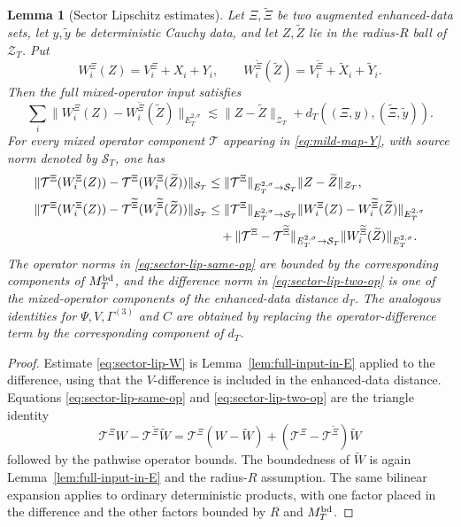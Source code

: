 \documentclass[10pt]{amsart}
\numberwithin{equation}{section}
\theoremstyle{plain}
\newtheorem{lemma}[theorem]{Lemma}
\theoremstyle{definition}
\theoremstyle{remark}
\newcommand{\calZ}{\mathcal{Z}}
\begin{document}
\begin{lemma}[Sector Lipschitz estimates]\label{lem:sector-lipschitz-estimates}
Let $\Xi,\widetilde\Xi$ be two augmented enhanced-data sets, let $y,\widetilde y$ be deterministic Cauchy data, and let $Z,\widetilde Z$ lie in the radius-$R$ ball of $\calZ_T$.  Put
\[
        W_i^\Xi(Z)=V_i^\Xi+X_i+Y_i,
        \qquad
        W_i^{\widetilde\Xi}(\widetilde Z)=V_i^{\widetilde\Xi}+\widetilde X_i+\widetilde Y_i.
\]
Then the full mixed-operator input satisfies
\begin{equation}\label{eq:sector-lip-W}
        \sum_i\|W_i^\Xi(Z)-W_i^{\widetilde\Xi}(\widetilde Z)\|_{E_T^{2,\sigma}}
        \lesssim
        \|Z-\widetilde Z\|_{\calZ_T}
        +d_T((\Xi,y),(\widetilde\Xi,\widetilde y)).
\end{equation}
For every mixed operator component $\mathcal T$ appearing in \eqref{eq:mild-map-Y}, with source norm denoted by $\mathcal S_T$, one has
\begin{align}
\|\mathcal T^\Xi(W_i^\Xi(Z))-\mathcal T^\Xi(W_i^\Xi(\widetilde Z))\|_{\mathcal S_T}
&\le \|\mathcal T^\Xi\|_{E_T^{2,\sigma}\to\mathcal S_T}
       \|Z-\widetilde Z\|_{\calZ_T},
\label{eq:sector-lip-same-op}\\
\|\mathcal T^\Xi(W_i^\Xi(Z))-\mathcal T^{\widetilde\Xi}(W_i^{\widetilde\Xi}(\widetilde Z))\|_{\mathcal S_T}
&\le \|\mathcal T^\Xi\|_{E_T^{2,\sigma}\to\mathcal S_T}
       \|W_i^\Xi(Z)-W_i^{\widetilde\Xi}(\widetilde Z)\|_{E_T^{2,\sigma}}\notag\\
&\quad +\|\mathcal T^\Xi-\mathcal T^{\widetilde\Xi}\|_{E_T^{2,\sigma}\to\mathcal S_T}
       \|W_i^{\widetilde\Xi}(\widetilde Z)\|_{E_T^{2,\sigma}}.
\label{eq:sector-lip-two-op}
\end{align}
The operator norms in \eqref{eq:sector-lip-same-op} are bounded by the corresponding components of $M_T^{\rm bd}$, and the difference norm in \eqref{eq:sector-lip-two-op} is one of the mixed-operator components of the enhanced-data distance $d_T$.  The analogous identities for $\Psi,V,\Gamma^{(3)}$ and $C$ are obtained by replacing the operator-difference term by the corresponding component of $d_T$.
\end{lemma}

\begin{proof}
Estimate \eqref{eq:sector-lip-W} is Lemma~\ref{lem:full-input-in-E} applied to the difference, using that the $V$-difference is included in the enhanced-data distance.  Equations \eqref{eq:sector-lip-same-op} and \eqref{eq:sector-lip-two-op} are the triangle identity
\[
        \mathcal T^\Xi W-\mathcal T^{\widetilde\Xi}\widetilde W
        =\mathcal T^\Xi(W-\widetilde W)
         +(\mathcal T^\Xi-\mathcal T^{\widetilde\Xi})\widetilde W
\]
followed by the pathwise operator bounds.  The boundedness of $\widetilde W$ is again Lemma~\ref{lem:full-input-in-E} and the radius-$R$ assumption.  The same bilinear expansion applies to ordinary deterministic products, with one factor placed in the difference and the other factors bounded by $R$ and $M_T^{\rm bd}$.
\end{proof}
\end{document}
